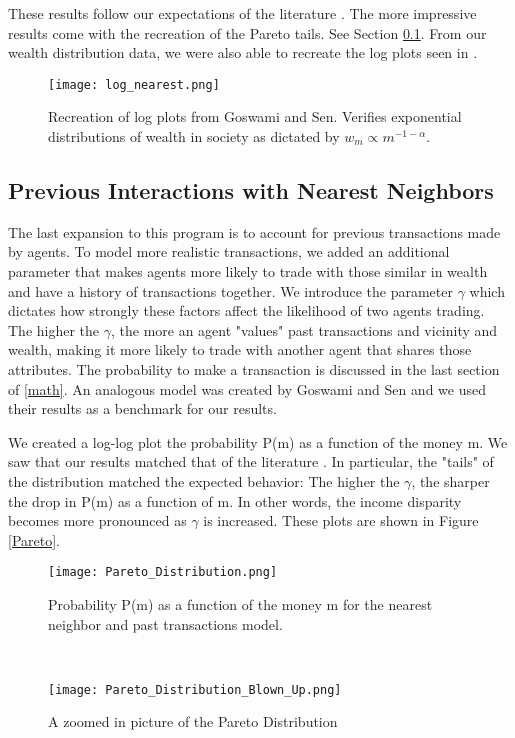\documentclass[11pt]{article}
\begin{document}
	These results follow our expectations of the literature \cite{goswami}. The more impressive results come with the recreation of the Pareto tails. See Section \ref{previous}. From our wealth distribution data, we were also able to recreate the log plots seen in \cite{goswami}.
	
	\begin{figure}
		\centering
		\texttt{[image: log\_nearest.png]}
		\caption{Recreation of log plots from Goswami and Sen. Verifies exponential distributions of wealth in society as dictated by $w_m \propto m^{-1-\alpha}$.}
		\label{logs}
	\end{figure}
	
	\subsection{Previous Interactions with Nearest Neighbors} \label{previous}
	The last expansion to this program is to account for previous transactions made by agents. To model more realistic transactions, we added an additional parameter that makes agents more likely to trade with those similar in wealth and have a history of transactions together. We introduce the parameter $\gamma$ which dictates how strongly these factors affect the likelihood of two agents trading. The higher the $\gamma$, the more an agent "values" past transactions and vicinity and wealth, making it more likely to trade with another agent that shares those attributes. The probability to make a transaction is discussed in the last section of \ref{math}. An analogous model was created by Goswami and Sen \cite{goswami} and we used their results as a benchmark for our results. 
	
	We created a log-log plot the probability P(m) as a function of the money m. We saw that our results matched that of the literature \cite{goswami}. In particular, the "tails" of the distribution matched the expected behavior: The higher the $\gamma$, the sharper the drop in P(m) as a function of m. In other words, the income disparity becomes more pronounced as $\gamma$ is increased. These plots are shown in Figure \ref{Pareto}.
	
	\begin{figure*}[!ht]
		\begin{subfigure}{0.5\textwidth}
			\texttt{[image: Pareto\_Distribution.png]}
			\caption{Probability P(m) as a function of the money m for the nearest neighbor and past transactions model.}
		\end{subfigure}
		~
		\begin{subfigure}{0.5\textwidth}
			\texttt{[image: Pareto\_Distribution\_Blown\_Up.png]}
			\caption{A zoomed in picture of the Pareto Distribution}
		\end{subfigure}
		\caption{The Pareto Distributions of our nearest neighbor and past transactions model. These behaviors match that of Goswami and Sen\cite{goswami}.}
		\label{Pareto}
	\end{figure*}
	
\end{document}
